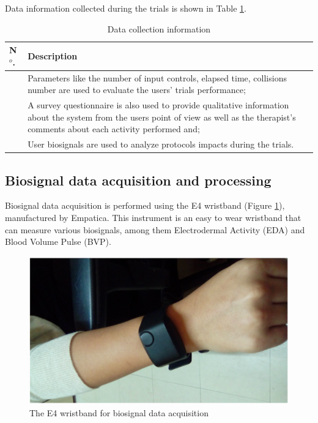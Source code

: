 Data information collected during the trials is shown in Table \ref{table:tbDataCollec}. 


\begin{table}[!hbt]
\caption{Data collection information}\label{table:tbDataCollec}
\centering
\begin{tabular}{ >{\centering}m{0.5cm}  >{}m{14.5cm} }
\toprule
N$^{o}$. &  Description \\
\midrule
1  	& Parameters like the number of input controls, elapsed time, collisions number are used to evaluate the users' trials performance;  \\ \hline
2 	& A survey questionnaire is also used to provide qualitative information about the system from the users point of view as well as the therapist's comments about each activity performed and; \\ \hline
3 	& User biosignals are used to analyze protocols impacts during the trials.\\
\bottomrule
\end{tabular}
\end{table}

\subsection{Biosignal data acquisition and processing}
\label{sec:biosig}
Biosignal data acquisition is performed using the E4 wristband (Figure \ref{fig:e4wristband}), manufactured by Empatica\textregistered. This instrument is an easy to wear wristband that can measure various biosignals, among them Electrodermal Activity (EDA) and Blood Volume Pulse (BVP).

\begin{figure}[!hbt]
\begin{center}
\includegraphics[width=0.8 \textwidth]{img/cap4/e4wristband}
\caption{The E4 wristband for biosignal data acquisition} \label{fig:e4wristband}
\end{center}
\end{figure}


